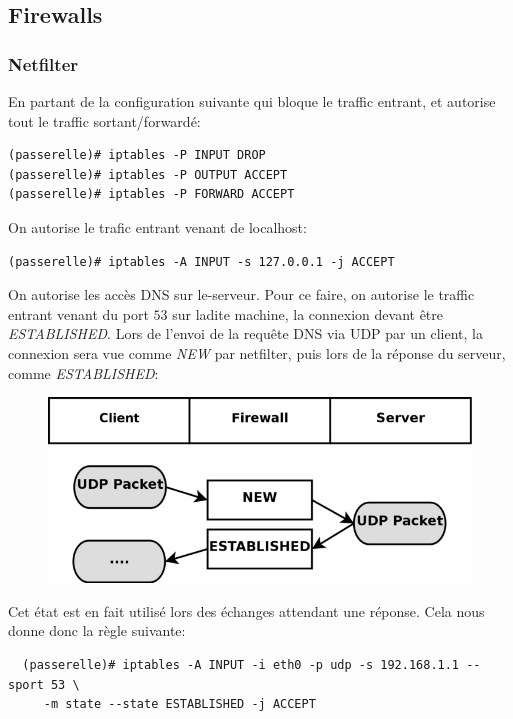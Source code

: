 \documentclass[a4paper]{article}
\begin{document}
\subsection{Firewalls}
\subsubsection{Netfilter}

En partant de la configuration suivante qui bloque le
traffic entrant, et autorise tout le traffic sortant/forwardé:
\begin{verbatim}
(passerelle)# iptables -P INPUT DROP
(passerelle)# iptables -P OUTPUT ACCEPT
(passerelle)# iptables -P FORWARD ACCEPT
\end{verbatim}

On autorise le trafic entrant venant de localhost:
\begin{verbatim}
(passerelle)# iptables -A INPUT -s 127.0.0.1 -j ACCEPT
\end{verbatim}

On autorise les accès DNS sur le-serveur. Pour ce faire,
on autorise le traffic entrant venant du port $53$ sur ladite
machine, la connexion devant être \textit{ESTABLISHED}. Lors
de l'envoi de la requête DNS via UDP par un client, la connexion
sera vue comme \textit{NEW} par netfilter, puis lors de la réponse
du serveur, comme \textit{ESTABLISHED}:
\begin{figure}[!ht]
	\centering
	\includegraphics[scale=.5]{state-udp-connection.png}
\end{figure}

Cet état est en fait utilisé lors des échanges attendant une réponse.
Cela nous donne donc la règle suivante:
\begin{verbatim}
  (passerelle)# iptables -A INPUT -i eth0 -p udp -s 192.168.1.1 --sport 53 \
     -m state --state ESTABLISHED -j ACCEPT
\end{verbatim}
\end{document}
